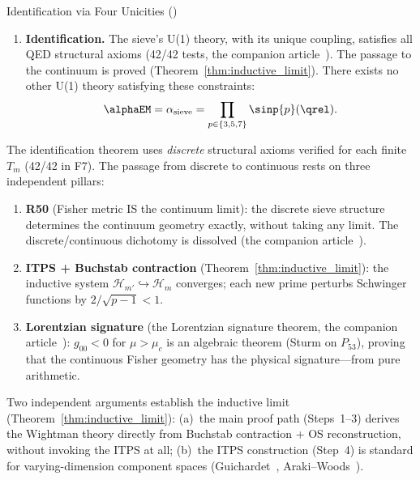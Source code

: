 \documentclass[12pt,a4paper]{article}
\begin{document}
\begin{thmbox}{Identification via Four Unicities (\BRIDGETAG)}
\begin{enumerate}[leftmargin=*, label=\textbf{(\roman*)}]
\item \textbf{Identification.}
  The sieve's U(1) theory, with its unique coupling, satisfies
  all QED structural axioms (42/42 tests, the companion article~\cite{companion_physics}). The passage to
  the continuum is proved (Theorem~\ref{thm:inductive_limit}).
  There exists no other U(1) theory satisfying these constraints:
  \begin{equation}
    \alphaEM = \alpha_{\rm sieve} = \prod_{p \in \{3,5,7\}} \sinp{p}(\qrel).
    \label{eq:identification}
  \end{equation}
\end{enumerate}
\end{thmbox}

\begin{remark}\mBR
\label{rem:caveat_discrete}
The identification theorem uses \emph{discrete} structural axioms verified
for each finite $T_m$ (42/42 in F7).
The passage from discrete to continuous rests on three independent pillars:
\begin{enumerate}[nosep]
\item \textbf{R50} (Fisher metric IS the continuum limit): the discrete
  sieve structure determines the continuum geometry exactly, without
  taking any limit.  The discrete/continuous dichotomy is dissolved
  (the companion article~\cite{companion_physics}).
\item \textbf{ITPS + Buchstab contraction}
  (Theorem~\ref{thm:inductive_limit}): the inductive system
  $\mathcal{H}_{m'} \hookrightarrow \mathcal{H}_m$ converges;
  each new prime perturbs Schwinger functions by $2/\!\sqrt{p-1} < 1$.
\item \textbf{Lorentzian signature} (the Lorentzian signature theorem,
  the companion article~\cite{companion_physics}): $g_{00} < 0$ for $\mu > \mu_c$ is an
  algebraic theorem (Sturm on $P_{53}$), proving that the continuous
  Fisher geometry has the physical signature---from pure arithmetic.
\end{enumerate}

\medskip\noindent
Two independent arguments establish the inductive limit
(Theorem~\ref{thm:inductive_limit}):
(a)~the main proof path (Steps~1--3) derives the Wightman theory
directly from Buchstab contraction + OS reconstruction, without
invoking the ITPS at all;
(b)~the ITPS construction (Step~4) is standard for varying-dimension
component spaces (Guichardet~\cite{Guichardet1966},
Araki--Woods~\cite{ArakiWoods1968}).
\end{remark}
\end{document}
